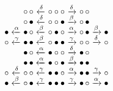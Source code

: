 \documentclass{beamer}
\begin{document}
\begin{equation*}
\begin{array}{@{}r@{\;}c@{\;}r@{\;}c@{\;}c@{\;}c@{\;}l@{\;}c@{\;}l@{}}
&& \circ \, \circ
& \xleftarrow{\smash{\delta}}
& \circ \circ \circ
& \xrightarrow{\smash{\delta}}
& \circ \, \circ\\
&& \circ \, \bullet
& \xleftarrow{\smash{\delta}}
& \circ \circ \bullet
& \xrightarrow{\smash{\beta}}
& \circ \, \bullet\\
  \bullet
& \xleftarrow{\smash{\alpha}}
& \bullet \, \circ
& \xleftarrow{\smash{\beta}}
& \circ \bullet \circ
& \xrightarrow{\smash{\alpha}}
& \circ \, \bullet
& \xrightarrow{\smash{\beta}}
& \bullet\\
  \circ
& \xleftarrow{\smash{\gamma}}
& \bullet \, \bullet
& \xleftarrow{\smash{\beta}}
& \circ \bullet \bullet
& \xrightarrow{\smash{\gamma}}
& \circ \, \circ
& \xrightarrow{\smash{\delta}}
& \circ\\
&& \bullet \, \circ
& \xleftarrow{\smash{\alpha}}
& \bullet \circ \circ
& \xrightarrow{\smash{\delta}}
& \bullet \, \circ\\
&& \bullet \, \bullet
& \xleftarrow{\smash{\alpha}}
& \bullet \circ \bullet
& \xrightarrow{\smash{\beta}}
& \bullet \, \bullet\\
  \circ
& \xleftarrow{\smash{\delta}}
& \circ \, \circ
& \xleftarrow{\smash{\gamma}}
& \bullet \bullet \circ
& \xrightarrow{\smash{\alpha}}
& \bullet \, \bullet
& \xrightarrow{\smash{\gamma}}
& \circ\\
  \bullet
& \xleftarrow{\smash{\beta}}
& \circ \, \bullet
& \xleftarrow{\smash{\gamma}}
& \bullet \bullet \bullet
& \xrightarrow{\smash{\gamma}}
& \bullet \, \circ
& \xrightarrow{\smash{\alpha}}
& \bullet
\end{array}
\end{equation*}
\end{document}
